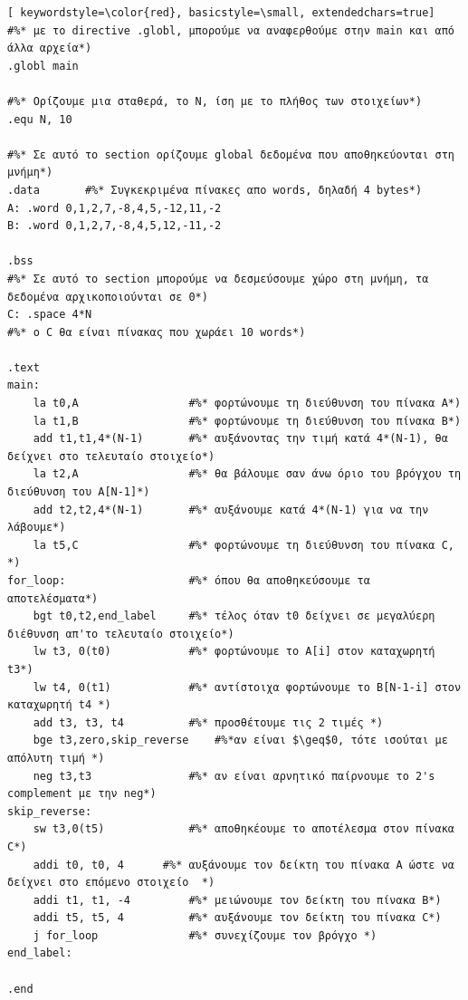 \documentclass[a4paper]{article}
\begin{document}
\begin{lstlisting}[ keywordstyle=\color{red}, basicstyle=\small, extendedchars=true]
#%* με το directive .globl, μπορούμε να αναφερθούμε στην main και από άλλα αρχεία*)
.globl main 

#%* Ορίζουμε μια σταθερά, το Ν, ίση με το πλήθος των στοιχείων*)
.equ N, 10

#%* Σε αυτό το section ορίζουμε global δεδομένα που αποθηκεύονται στη μνήμη*)
.data		#%* Συγκεκριμένα πίνακες απο words, δηλαδή 4 bytes*)
A: .word 0,1,2,7,-8,4,5,-12,11,-2
B: .word 0,1,2,7,-8,4,5,12,-11,-2

.bss
#%* Σε αυτό το section μπορούμε να δεσμεύσουμε χώρο στη μνήμη, τα δεδομένα αρχικοποιούνται σε 0*)
C: .space 4*N
#%* ο C θα είναι πίνακας που χωράει 10 words*)

.text
main:
    la t0,A					#%* φορτώνουμε τη διεύθυνση του πίνακα Α*)
    la t1,B					#%* φορτώνουμε τη διεύθυνση του πίνακα Β*)
    add t1,t1,4*(N-1)		#%* αυξάνοντας την τιμή κατά 4*(Ν-1), θα δείχνει στο τελευταίο στοιχείο*)
    la t2,A					#%* θα βάλουμε σαν άνω όριο του βρόγχου τη διεύθυνση του A[N-1]*)
    add t2,t2,4*(N-1)       #%* αυξάνουμε κατά 4*(Ν-1) για να την λάβουμε*)
    la t5,C                 #%* φορτώνουμε τη διεύθυνση του πίνακα C, *) 
for_loop:					#%* όπου θα αποθηκεύσουμε τα αποτελέσματα*)
    bgt t0,t2,end_label		#%* τέλος όταν t0 δείχνει σε μεγαλύερη διέθυνση απ'το τελευταίο στοιχείο*)
    lw t3, 0(t0)            #%* φορτώνουμε το A[i] στον καταχωρητή t3*)
    lw t4, 0(t1)            #%* αντίστοιχα φορτώνουμε το Β[N-1-i] στον καταχωρητή t4 *)
    add t3, t3, t4			#%* προσθέτουμε τις 2 τιμές *) 
    bge t3,zero,skip_reverse	#%*αν είναι $\geq$0, τότε ισούται με απόλυτη τιμή *) 
    neg t3,t3               #%* αν είναι αρνητικό παίρνουμε το 2's complement με την neg*) 
skip_reverse:				
    sw t3,0(t5)				#%* αποθηκέουμε το αποτέλεσμα στον πίνακα C*) 
    addi t0, t0, 4	 	#%* αυξάνουμε τον δείκτη του πίνακα Α ώστε να δείχνει στο επόμενο στοιχείο	*) 	
    addi t1, t1, -4			#%* μειώνουμε τον δείκτη του πίνακα Β*) 
    addi t5, t5, 4			#%* αυξάνουμε τον δείκτη του πίνακα C*) 
    j for_loop				#%* συνεχίζουμε τον βρόγχο *) 
end_label:

.end
\end{lstlisting}

\vspace{\baselineskip}
\vspace{\baselineskip}
\vspace{\baselineskip}
\vspace{\baselineskip}
\vspace{\baselineskip}
\vspace{\baselineskip}
\pagebreak
\end{document}
